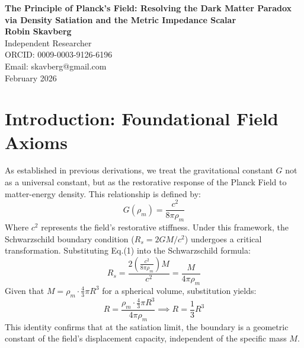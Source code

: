 \documentclass[12pt,a4paper]{article}
\begin{document}
\begin{center}
    \large \textbf{The Principle of Planck’s Field: Resolving the Dark Matter Paradox via Density Satiation and the Metric Impedance Scalar} \\
    \vspace{1em}
    \normalsize \textbf{Robin Skavberg} \\
    \normalsize Independent Researcher \\
    \normalsize ORCID: 0009-0003-9126-6196 \\
    \normalsize Email: skavberg@gmail.com \\
    \vspace{1em}
    \normalsize February 2026
\end{center}

\begin{abstract}
This paper formalizes the "Frozen Core" identity of Dark Matter by demonstrating that the Schwarzschild boundary is a density-dependent phase transition rather than a mass-dependent spatial coordinate. By applying the variable gravitational resultant $G(\rho_m)$, we prove that matter reaching the field satiation threshold $\rho_{sat}$ loses all vibrational degrees of freedom, rendering it electromagnetically silent and thermodynamically at absolute zero. We validate this model by demonstrating that the neutrino naturally exists in this satiated state, identifying it as the fundamental subatomic constituent of Dark Matter.
\end{abstract}

\section{Introduction: Foundational Field Axioms}
As established in previous derivations, we treat the gravitational constant $G$ not as a universal constant, but as the restorative response of the Planck Field to matter-energy density. This relationship is defined by:
\begin{equation}
G(\rho_m) = \frac{c^2}{8\pi\rho_m}
\end{equation}
Where $c^2$ represents the field's restorative stiffness. Under this framework, the Schwarzschild boundary condition ($R_s = 2GM/c^2$) undergoes a critical transformation. Substituting Eq.(1) into the Schwarzschild formula:
\begin{equation}
R_s = \frac{2 \left( \frac{c^2}{8\pi\rho_m} \right) M}{c^2} = \frac{M}{4\pi\rho_m}
\end{equation}
Given that $M = \rho_m \cdot \frac{4}{3}\pi R^3$ for a spherical volume, substitution yields:
\begin{equation}
R = \frac{\rho_m \cdot \frac{4}{3}\pi R^3}{4\pi\rho_m} \implies R = \frac{1}{3}R^3
\end{equation}
This identity confirms that at the satiation limit, the boundary is a geometric constant of the field's displacement capacity, independent of the specific mass $M$.
\end{document}
